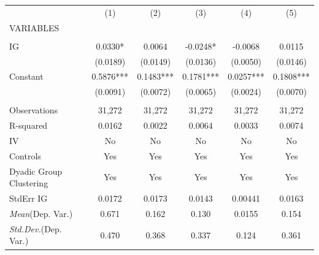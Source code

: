 \documentclass[]{article}
\begin{document}
\begin{tabular}{lccccc} \hline
 & (1) & (2) & (3) & (4) & (5) \\
VARIABLES &  &  &  &  &  \\ \hline
 &  &  &  &  &  \\
IG & 0.0330* & 0.0064 & -0.0248* & -0.0068 & 0.0115 \\
 & (0.0189) & (0.0149) & (0.0136) & (0.0050) & (0.0146) \\
Constant & 0.5876*** & 0.1483*** & 0.1781*** & 0.0257*** & 0.1808*** \\
 & (0.0091) & (0.0072) & (0.0065) & (0.0024) & (0.0070) \\
 &  &  &  &  &  \\
Observations & 31,272 & 31,272 & 31,272 & 31,272 & 31,272 \\
R-squared & 0.0162 & 0.0022 & 0.0064 & 0.0033 & 0.0074 \\
IV & No & No & No & No & No \\
Controls & Yes & Yes & Yes & Yes & Yes \\
Dyadic Group Clustering & Yes & Yes & Yes & Yes & Yes \\
StdErr IG & 0.0172 & 0.0173 & 0.0143 & 0.00441 & 0.0163 \\
\textit{Mean}(Dep. Var.) & 0.671 & 0.162 & 0.130 & 0.0155 & 0.154 \\
 \textit{Std.Dev.}(Dep. Var.) & 0.470 & 0.368 & 0.337 & 0.124 & 0.361 \\ \hline
\end{tabular}
\end{document}
